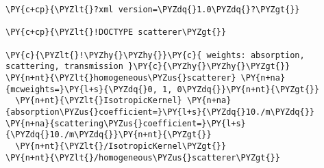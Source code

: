 \begin{Verbatim}[commandchars=\\\{\},fontsize=\tiny]
\PY{c+cp}{\PYZlt{}?xml version=\PYZdq{}1.0\PYZdq{}?\PYZgt{}}

\PY{c+cp}{\PYZlt{}!DOCTYPE scatterer\PYZgt{}}

\PY{c}{\PYZlt{}!\PYZhy{}\PYZhy{}}\PY{c}{ weights: absorption, scattering, transmission }\PY{c}{\PYZhy{}\PYZhy{}\PYZgt{}}
\PY{n+nt}{\PYZlt{}homogeneous\PYZus{}scatterer} \PY{n+na}{mcweights=}\PY{l+s}{\PYZdq{}0, 1, 0\PYZdq{}}\PY{n+nt}{\PYZgt{}}
  \PY{n+nt}{\PYZlt{}IsotropicKernel} \PY{n+na}{absorption\PYZus{}coefficient=}\PY{l+s}{\PYZdq{}10./m\PYZdq{}} \PY{n+na}{scattering\PYZus{}coefficient=}\PY{l+s}{\PYZdq{}10./m\PYZdq{}}\PY{n+nt}{\PYZgt{}}
  \PY{n+nt}{\PYZlt{}/IsotropicKernel\PYZgt{}}
\PY{n+nt}{\PYZlt{}/homogeneous\PYZus{}scatterer\PYZgt{}}
\end{Verbatim}
